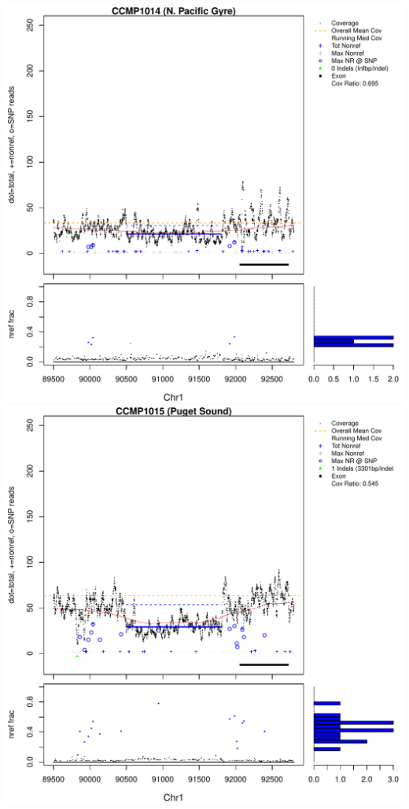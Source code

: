 \documentclass{article}\usepackage[]{graphicx}\usepackage[]{color}
\makeatletter
\def\maxwidth{ %
  \ifdim\Gin@nat@width>\linewidth
    \linewidth
  \else
    \Gin@nat@width
  \fi
}
\newenvironment{knitrout}{}{} %
\makeatother
\begin{document}
\begin{knitrout}
{\includegraphics[width=\maxwidth]{figs-knitr/unnamed-chunk-47-5} 
\includegraphics[width=\maxwidth]{figs-knitr/unnamed-chunk-47-6} 
}
\end{knitrout}
\end{document}
